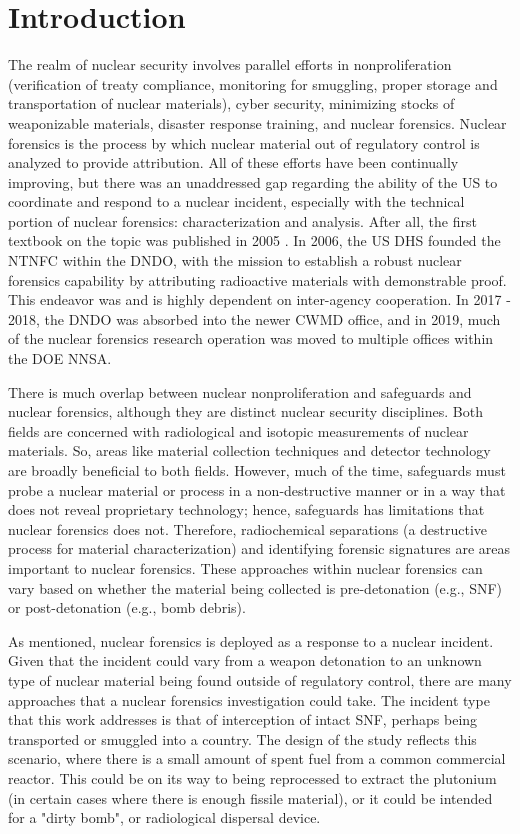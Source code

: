
\glsresetall

\chapter{Introduction}
\label{ch:intro}

The realm of nuclear security involves parallel efforts in nonproliferation
(verification of treaty compliance, monitoring for smuggling, proper storage
and transportation of nuclear materials), cyber security, minimizing stocks of
weaponizable materials, disaster response training, and nuclear forensics.
Nuclear forensics is the process by which nuclear material out of regulatory
control is analyzed to provide attribution.  All of these efforts have been
continually improving, but there was an unaddressed gap regarding the ability
of the \gls{US} to coordinate and respond to a nuclear incident, especially
with the technical portion of nuclear forensics: characterization and analysis.
After all, the first textbook on the topic was published in 2005
\cite{nftext_2005}. In 2006, the \gls{US} \gls{DHS} founded the \gls{NTNFC}
within the \gls{DNDO}, with the mission to establish a robust nuclear forensics
capability by attributing radioactive materials with demonstrable proof. This
endeavor was and is highly dependent on inter-agency cooperation. In 2017 \--
2018, the \gls{DNDO} was absorbed into the newer \gls{CWMD} office, and in
2019, much of the nuclear forensics research operation was moved to multiple
offices within the \gls{DOE} \gls{NNSA}. 

There is much overlap between nuclear nonproliferation and safeguards and
nuclear forensics, although they are distinct nuclear security disciplines.
Both fields are concerned with radiological and isotopic measurements of
nuclear materials. So, areas like material collection techniques and detector
technology are broadly beneficial to both fields. However, much of the time,
safeguards must probe a nuclear material or process in a non-destructive manner
or in a way that does not reveal proprietary technology; hence, safeguards has
limitations that nuclear forensics does not.  Therefore, radiochemical
separations (a destructive process for material characterization) and
identifying forensic signatures are areas important to nuclear forensics.
These approaches within nuclear forensics can vary based on whether the
material being collected is pre-detonation (e.g., \gls{SNF}) or post-detonation
(e.g., bomb debris). 

As mentioned, nuclear forensics is deployed as a response to a nuclear
incident. Given that the incident could vary from a weapon detonation to an
unknown type of nuclear material being found outside of regulatory control,
there are many approaches that a nuclear forensics investigation could take.
The incident type that this work addresses is that of interception of intact
\gls{SNF}, perhaps being transported or smuggled into a country. The design of
the study reflects this scenario, where there is a small amount of spent fuel
from a common commercial reactor. This could be on its way to being reprocessed
to extract the plutonium (in certain cases where there is enough fissile
material), or it could be intended for a "dirty bomb", or radiological
dispersal device. 

